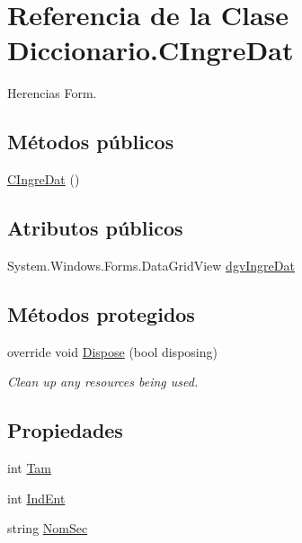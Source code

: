 \hypertarget{class_diccionario_1_1_c_ingre_dat}{\section{Referencia de la Clase Diccionario.\-C\-Ingre\-Dat}
\label{class_diccionario_1_1_c_ingre_dat}
}


Herencias Form.

\subsection*{Métodos públicos}
\begin{DoxyCompactItemize}
\item 
\hyperlink{class_diccionario_1_1_c_ingre_dat_a9624d0f627171f8a3c5e2323029f6ed5}{C\-Ingre\-Dat} ()
\end{DoxyCompactItemize}
\subsection*{Atributos públicos}
\begin{DoxyCompactItemize}
\item 
System.\-Windows.\-Forms.\-Data\-Grid\-View \hyperlink{class_diccionario_1_1_c_ingre_dat_a5a906b43b145397bd16d4c58416c8136}{dgv\-Ingre\-Dat}
\end{DoxyCompactItemize}
\subsection*{Métodos protegidos}
\begin{DoxyCompactItemize}
\item 
override void \hyperlink{class_diccionario_1_1_c_ingre_dat_a5058285b983cd39c6cc108685a6dc965}{Dispose} (bool disposing)
\begin{DoxyCompactList}\small\item\em Clean up any resources being used. \end{DoxyCompactList}\end{DoxyCompactItemize}
\subsection*{Propiedades}
\begin{DoxyCompactItemize}
\item 
int \hyperlink{class_diccionario_1_1_c_ingre_dat_a96cc059c90c516c7dc2d77b145c42966}{Tam}
\item 
int \hyperlink{class_diccionario_1_1_c_ingre_dat_a88346d52d51ff76cc6147408e8c4f1f8}{Ind\-Ent}
\item 
string \hyperlink{class_diccionario_1_1_c_ingre_dat_ab57e356c79271d9f25fe862b9afc617c}{Nom\-Sec}
\end{DoxyCompactItemize}


